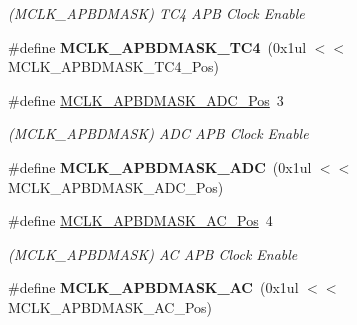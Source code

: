 \begin{DoxyCompactItemize}
\begin{DoxyCompactList}\small\item\em (M\+C\+L\+K\+\_\+\+A\+P\+B\+D\+M\+A\+S\+K) T\+C4 A\+P\+B Clock Enable \end{DoxyCompactList}\item 
\hypertarget{group___s_a_m_l21___m_c_l_k_gab6acdfbe094d9b0e4f69bbff979f64e6}{}\#define {\bfseries M\+C\+L\+K\+\_\+\+A\+P\+B\+D\+M\+A\+S\+K\+\_\+\+T\+C4}~(0x1ul $<$$<$ M\+C\+L\+K\+\_\+\+A\+P\+B\+D\+M\+A\+S\+K\+\_\+\+T\+C4\+\_\+\+Pos)\label{group___s_a_m_l21___m_c_l_k_gab6acdfbe094d9b0e4f69bbff979f64e6}

\item 
\hypertarget{group___s_a_m_l21___m_c_l_k_ga82ab9cf32c337d1ebb62297a5a4ef23b}{}\#define \hyperlink{group___s_a_m_l21___m_c_l_k_ga82ab9cf32c337d1ebb62297a5a4ef23b}{M\+C\+L\+K\+\_\+\+A\+P\+B\+D\+M\+A\+S\+K\+\_\+\+A\+D\+C\+\_\+\+Pos}~3\label{group___s_a_m_l21___m_c_l_k_ga82ab9cf32c337d1ebb62297a5a4ef23b}

\begin{DoxyCompactList}\small\item\em (M\+C\+L\+K\+\_\+\+A\+P\+B\+D\+M\+A\+S\+K) A\+D\+C A\+P\+B Clock Enable \end{DoxyCompactList}\item 
\hypertarget{group___s_a_m_l21___m_c_l_k_ga1c4a96831e7097762131640ea3a2a18d}{}\#define {\bfseries M\+C\+L\+K\+\_\+\+A\+P\+B\+D\+M\+A\+S\+K\+\_\+\+A\+D\+C}~(0x1ul $<$$<$ M\+C\+L\+K\+\_\+\+A\+P\+B\+D\+M\+A\+S\+K\+\_\+\+A\+D\+C\+\_\+\+Pos)\label{group___s_a_m_l21___m_c_l_k_ga1c4a96831e7097762131640ea3a2a18d}

\item 
\hypertarget{group___s_a_m_l21___m_c_l_k_ga60557062e19bd94f9b08ee6e6b97f9dc}{}\#define \hyperlink{group___s_a_m_l21___m_c_l_k_ga60557062e19bd94f9b08ee6e6b97f9dc}{M\+C\+L\+K\+\_\+\+A\+P\+B\+D\+M\+A\+S\+K\+\_\+\+A\+C\+\_\+\+Pos}~4\label{group___s_a_m_l21___m_c_l_k_ga60557062e19bd94f9b08ee6e6b97f9dc}

\begin{DoxyCompactList}\small\item\em (M\+C\+L\+K\+\_\+\+A\+P\+B\+D\+M\+A\+S\+K) A\+C A\+P\+B Clock Enable \end{DoxyCompactList}\item 
\hypertarget{group___s_a_m_l21___m_c_l_k_gacff1b48dd89483139c8429e50eac4928}{}\#define {\bfseries M\+C\+L\+K\+\_\+\+A\+P\+B\+D\+M\+A\+S\+K\+\_\+\+A\+C}~(0x1ul $<$$<$ M\+C\+L\+K\+\_\+\+A\+P\+B\+D\+M\+A\+S\+K\+\_\+\+A\+C\+\_\+\+Pos)\label{group___s_a_m_l21___m_c_l_k_gacff1b48dd89483139c8429e50eac4928}


\end{DoxyCompactItemize}
